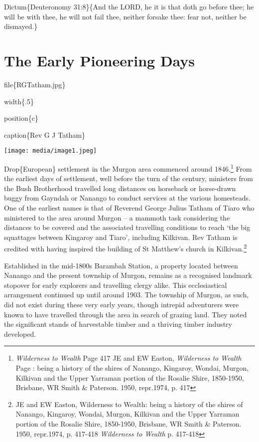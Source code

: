 Dictum\{Deuteronomy 31:8\}\{And the LORD, he it is that doth go before thee; he will be with thee, he will not fail thee, neither forsake thee: fear not, neither be dismayed.\}

\hypertarget{the-early-pioneering-days}{%
\chapter{The Early Pioneering Days}\label{the-early-pioneering-days}}

file\{RGTatham.jpg\}

width\{.5\}

position\{c\}

caption\{Rev G J Tatham\}

\texttt{[image: media/image1.jpeg]}

Drop\{European\} settlement in the Murgon area commenced around 1846.\footnote{\emph{Wilderness to Wealth} Page 417 JE and EW Easton, \emph{Wilderness to Wealth} Page : being a history of the shires of Nanango, Kingaroy, Wondai, Murgon, Kilkivan and the Upper Yarraman portion of the Rosalie Shire, 1850-1950, Brisbane, WR Smith \& Paterson. 1950, repr.1974, p. 417} From the earliest days of settlement, well before the turn of the century, ministers from the Bush Brotherhood travelled long distances on horseback or horse-drawn buggy from Gayndah or Nanango to conduct services at the various homesteads. One of the earliest names is that of Reverend George Julius Tatham of Tiaro who ministered to the area around Murgon -- a mammoth task considering the distances to be covered and the associated travelling conditions to reach `the big squattages between Kingaroy and Tiaro'\emph{,} including Kilkivan. Rev Tatham is credited with having inspired the building of St Matthew's church in Kilkivan.\footnote{JE and EW Easton, Wilderness to Wealth: being a history of the shires of Nanango, Kingaroy, Wondai, Murgon, Kilkivan and the Upper Yarraman portion of the Rosalie Shire, 1850-1950, Brisbane, WR Smith \& Paterson. 1950, repr.1974, p. 417-418 \emph{Wilderness to Wealth} p. 417-418}

Established in the mid-1800s Barambah Station\emph{,} a property located between Nanango and the present township of Murgon, remains as a recognised landmark stopover for early explorers and travelling clergy alike. This ecclesiastical arrangement continued up until around 1903. The township of Murgon, as such, did not exist during these very early years, though intrepid adventurers were known to have travelled through the area in search of grazing land. They noted the significant stands of harvestable timber and a thriving timber industry developed.

